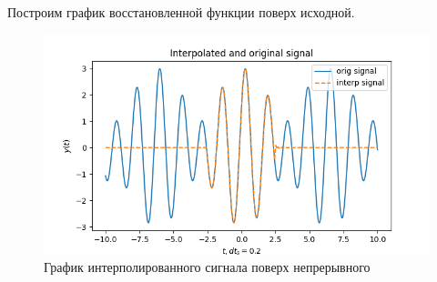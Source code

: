 \documentclass[a4paper, 12pt]{article}
\begin{document}
    Построим график восстановленной функции поверх исходной.
    \begin{figure}[H]
        \centering
        \includegraphics[scale=0.45]{1_isine.png}
        \captionsetup{skip=0pt}
        \caption{График интерполированного сигнала поверх непрерывного}
        \label{fig:1isine}
    \end{figure}
    
\end{document}
